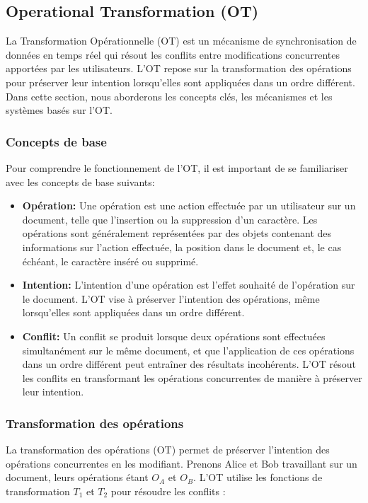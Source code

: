 \subsection{Operational Transformation (OT)}

La Transformation Opérationnelle (OT) est un mécanisme de synchronisation de données en temps réel qui résout les conflits entre modifications concurrentes apportées par les utilisateurs. L'OT repose sur la transformation des opérations pour préserver leur intention lorsqu'elles sont appliquées dans un ordre différent. Dans cette section, nous aborderons les concepts clés, les mécanismes et les systèmes basés sur l'OT.

\subsubsection{Concepts de base}

Pour comprendre le fonctionnement de l'OT, il est important de se familiariser avec les concepts de base suivants:

\begin{itemize}
\item \textbf{Opération:} Une opération est une action effectuée par un utilisateur sur un document, telle que l'insertion ou la suppression d'un caractère. Les opérations sont généralement représentées par des objets contenant des informations sur l'action effectuée, la position dans le document et, le cas échéant, le caractère inséré ou supprimé.
\item \textbf{Intention:} L'intention d'une opération est l'effet souhaité de l'opération sur le document. L'OT vise à préserver l'intention des opérations, même lorsqu'elles sont appliquées dans un ordre différent.
\item \textbf{Conflit:} Un conflit se produit lorsque deux opérations sont effectuées simultanément sur le même document, et que l'application de ces opérations dans un ordre différent peut entraîner des résultats incohérents. L'OT résout les conflits en transformant les opérations concurrentes de manière à préserver leur intention.
\end{itemize}

\subsubsection{Transformation des opérations}

La transformation des opérations (OT) permet de préserver l'intention des opérations concurrentes en les modifiant. Prenons Alice et Bob travaillant sur un document, leurs opérations étant $O_A$ et $O_B$. L'OT utilise les fonctions de transformation $T_1$ et $T_2$ pour résoudre les conflits :

